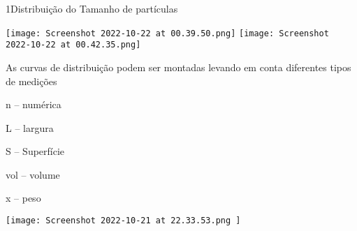 \documentclass["./OSF-Slides_annotations.tex"]{subfiles}
\begin{document}
\begin{sectionBox}1{Distribuição do Tamanho de partículas} %
    
    \begin{multicols}{2}\centering
        \texttt{[image: Screenshot 2022-10-22 at 00.39.50.png]}
        \texttt{[image: Screenshot 2022-10-22 at 00.42.35.png]}
    \end{multicols}

    As curvas de distribuição podem ser montadas levando em conta diferentes tipos de medições
    \begin{itemize}
        \begin{multicols}{3}
           \item[n --] numérica
           \item[L --] largura
           \item[S --] Superfície
           \item[vol --] volume
           \item[x --] peso
        \end{multicols}
    \end{itemize}

    \begin{center}
        \texttt{[image: 
            Screenshot 2022-10-21 at 22.33.53.png
        ]}
    \end{center}

\end{sectionBox}
\end{document}
